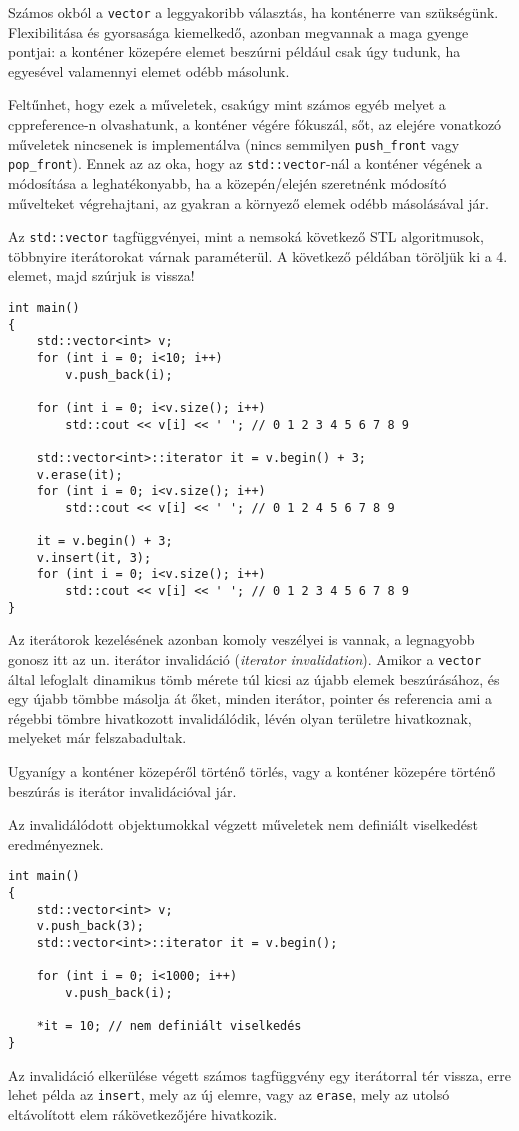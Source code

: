 \documentclass[../cpp_book/cpp_book.tex]{subfiles}
\begin{document}
	\begin{note}
		Számos okból a \texttt{vector} a leggyakoribb választás, ha konténerre van szükségünk. Flexibilitása és gyorsasága kiemelkedő, azonban megvannak a maga gyenge pontjai: a konténer közepére elemet beszúrni például csak úgy tudunk, ha egyesével valamennyi elemet odébb másolunk.
	\end{note}
	
	Feltűnhet, hogy ezek a műveletek, csakúgy mint számos egyéb melyet a cppreference-n olvashatunk, a konténer végére fókuszál, sőt, az elejére vonatkozó műveletek nincsenek is implementálva (nincs semmilyen \texttt{push\_front} vagy \texttt{pop\_front}). Ennek az az oka, hogy az \texttt{std::vector}-nál a konténer végének a módosítása a leghatékonyabb, ha a közepén/elején szeretnénk módosító művelteket végrehajtani, az gyakran a környező elemek odébb másolásával jár.

	\medskip
	Az \texttt{std::vector} tagfüggvényei, mint a nemsoká következő STL algoritmusok, többnyire iterátorokat várnak paraméterül. A következő példában töröljük ki a 4. elemet, majd szúrjuk is vissza!
	\begin{lstlisting}
int main()
{
	std::vector<int> v;
	for (int i = 0; i<10; i++)
		v.push_back(i);
		
	for (int i = 0; i<v.size(); i++)
		std::cout << v[i] << ' '; // 0 1 2 3 4 5 6 7 8 9
		
	std::vector<int>::iterator it = v.begin() + 3;
	v.erase(it);
	for (int i = 0; i<v.size(); i++)
		std::cout << v[i] << ' '; // 0 1 2 4 5 6 7 8 9
	
	it = v.begin() + 3;
	v.insert(it, 3);
	for (int i = 0; i<v.size(); i++)
		std::cout << v[i] << ' '; // 0 1 2 3 4 5 6 7 8 9
}
	\end{lstlisting}
	Az iterátorok kezelésének azonban komoly veszélyei is vannak, a legnagyobb gonosz itt az un. iterátor invalidáció (\textit{iterator invalidation}). Amikor a \texttt{vector} által lefoglalt dinamikus tömb mérete túl kicsi az újabb elemek beszúrásához, és egy újabb tömbbe másolja át őket, minden iterátor, pointer és referencia ami a régebbi tömbre hivatkozott invalidálódik, lévén olyan területre hivatkoznak, melyeket már felszabadultak. 
	\smallskip
	
	Ugyanígy a konténer közepéről történő törlés, vagy a konténer közepére történő beszúrás is iterátor invalidációval jár.
	\smallskip
	
	Az invalidálódott objektumokkal végzett műveletek nem definiált viselkedést eredményeznek.
	\begin{lstlisting}
int main()
{
	std::vector<int> v;
	v.push_back(3);
	std::vector<int>::iterator it = v.begin();
	
	for (int i = 0; i<1000; i++)
		v.push_back(i);
		
	*it = 10; // nem definiált viselkedés
}
	\end{lstlisting}
	Az invalidáció elkerülése végett számos tagfüggvény egy iterátorral tér vissza, erre lehet példa az \texttt{insert}, mely az új elemre, vagy az \texttt{erase}, mely az utolsó eltávolított elem rákövetkezőjére hivatkozik.
	
\end{document}
